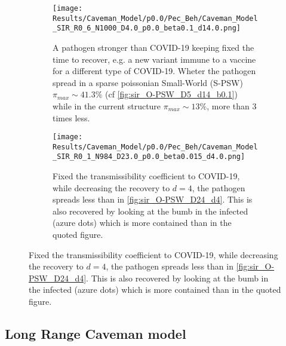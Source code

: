 \documentclass[a4paper,10pt,twoside]{book} %
\theoremstyle{definition}
\begin{document}
\begin{figure}[htbp]
	\centering
	\begin{subfigure}{0.8\linewidth}
		\texttt{[image: Results/Caveman\_Model/p0.0/Pec\_Beh/Caveman\_Model\_SIR\_R0\_6\_N1000\_D4.0\_p0.0\_beta0.1\_d14.0.png]}
		\caption{A pathogen stronger than COVID-19 keeping fixed the time to recover, e.g. a new variant immune to a vaccine for a different type of COVID-19. Wheter the pathogen spread in a sparse poissonian Small-World (S-PSW) $ \pi_{max} \sim 41.3\%$ (cf \autoref{fig:sir_O-PSW_D5_d14_b0.1}) while in the current structure $ \pi_{max} \sim 13\%$, more than $ 3$ times less.}
		\label{fig:sir_CM_D4_OR1_d14_b0.1}
	\end{subfigure}
	\par\bigskip
	\centering
	\begin{subfigure}{0.8\linewidth}
		\texttt{[image: Results/Caveman\_Model/p0.0/Pec\_Beh/Caveman\_Model\_SIR\_R0\_1\_N984\_D23.0\_p0.0\_beta0.015\_d4.0.png]}
		\caption{Fixed the transmissibility coefficient to COVID-19, while decreasing the recovery to $d = 4$, the pathogen spreads less than in \autoref{fig:sir_O-PSW_D24_d4}. This is also recovered by looking at the bumb in the infected (azure dots) which is more contained than in the quoted figure.}
		\label{fig:sir_CM_D23_d4}
	\end{subfigure}
\end{figure}

\clearpage
\subsection{Long Range Caveman model}
\label{sec:res_LRCM}
\end{document}
